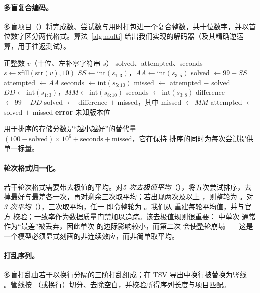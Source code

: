 \paragraph{多盲复合编码。}多盲项目（）将完成数、尝试数与用时打包进一个复合整数，共十位数字，并以首位数字区分两代格式。算法~\ref{alg:multi} 给出我们实现的解码器（及其精确逆运算，用于往返测试）。

\begin{algorithm}[t]
\caption{\wca{} 多盲复合值的解码。}
\label{alg:multi}
\begin{algorithmic}[1]
\Require 正整数 $v$（十位、左补零字符串 $s$）
\Ensure solved、attempted、seconds
\State $s \gets \mathrm{zfill}(\mathrm{str}(v), 10)$
 
    \State $SS \gets \mathrm{int}(s_{1:3})$，$AA \gets \mathrm{int}(s_{3:5})$
    \State solved $\gets 99 - SS$
    \State attempted $\gets AA$
    \State seconds $\gets \mathrm{int}(s_{5:10})$
    \State missed $\gets$ attempted $-$ solved 
 
    \State $DD \gets \mathrm{int}(s_{1:3})$，$MM \gets \mathrm{int}(s_{8:10})$
    \State seconds $\gets \mathrm{int}(s_{3:8})$
    \State difference $\gets 99 - DD$
    \State solved $\gets$ difference $+$ missed，其中 missed $\gets MM$
    \State attempted $\gets$ solved $+$ missed
\Else
    \State \textbf{error} 未知版本位
\EndIf
\end{algorithmic}
\end{algorithm}

用于排序的存储分数是“越小越好”的替代量 $(100-\text{solved})\times 10^6 + \text{seconds} + \text{missed}$，它在保持 \wca{} 排序的同时为每次尝试提供单一标量。

\paragraph{轮次格式归一化。}若干轮次格式需要带去极值的平均。对\emph{5 次去极值平均}（），将五次尝试排序，去掉最好与最差各一次，再对剩余三次取平均；若出现两次及以上 \DNF{}，则整轮为 \DNF{}。对\emph{3 次平均}（），三次取平均，任一 \DNF{} 即令整轮为 \DNF{}。我们从  重建每轮平均值，并与官方  校验；一致率作为数据质量门禁加以追踪。该去极值规则很重要： 中单次 \DNF{} 通常作为“最差”被丢弃，因此单次 \DNF{} 的边际影响较小，而第二次 \DNF{} 会使整轮崩塌——这是一个模型必须显式刻画的非连续效应，而非简单取平均。

\paragraph{打乱序列。}多盲打乱由若干以换行分隔的三阶打乱组成；在 TSV 导出中换行被替换为竖线 \code{|}。管线按 \code{|}（或换行）切分、去除空白，并校验所得序列长度与项目匹配。

